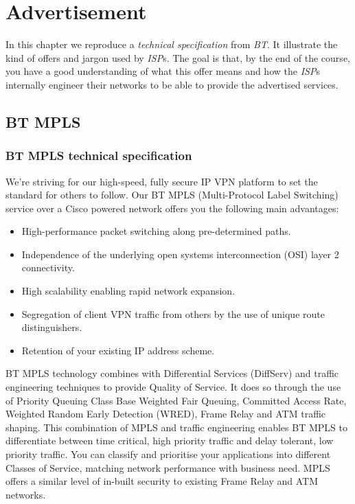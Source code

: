 \chapter{Advertisement}

In this chapter we reproduce a \emph{technical specification} from \emph{BT}. 
It illustrate the kind of offers and jargon used by \emph{ISP}s.
The goal is that, by the end of the course, you have a good understanding of what this offer means and how the \emph{ISP}s internally engineer their networks to be able to provide the advertised services.

\section{BT MPLS}
        
        
\subsection{BT MPLS technical specification}

We're striving for our high-speed, fully secure IP VPN platform to set the standard for others to follow. Our BT MPLS (Multi-Protocol Label Switching) service over a Cisco powered network offers you the following main advantages:

\begin{itemize}
\item High-performance packet switching along pre-determined paths.
\item Independence of the underlying open systems interconnection (OSI) layer 2 connectivity.
\item High scalability enabling rapid network expansion.
\item Segregation of client VPN traffic from others by the use of unique route distinguishers.
\item Retention of your existing IP address scheme.
\end{itemize}

BT MPLS technology combines with Differential Services (DiffServ) and traffic engineering techniques to provide Quality of Service. It does so through the use of Priority Queuing Class Base Weighted Fair Queuing, Committed Access Rate, Weighted Random Early Detection (WRED), Frame Relay and ATM traffic shaping. This combination of MPLS and traffic engineering enables BT MPLS to differentiate between time critical, high priority traffic and delay tolerant, low priority traffic. You can classify and prioritise your applications into different Classes of Service, matching network performance with business need. MPLS offers a similar level of in-built security to existing Frame Relay and ATM networks.


